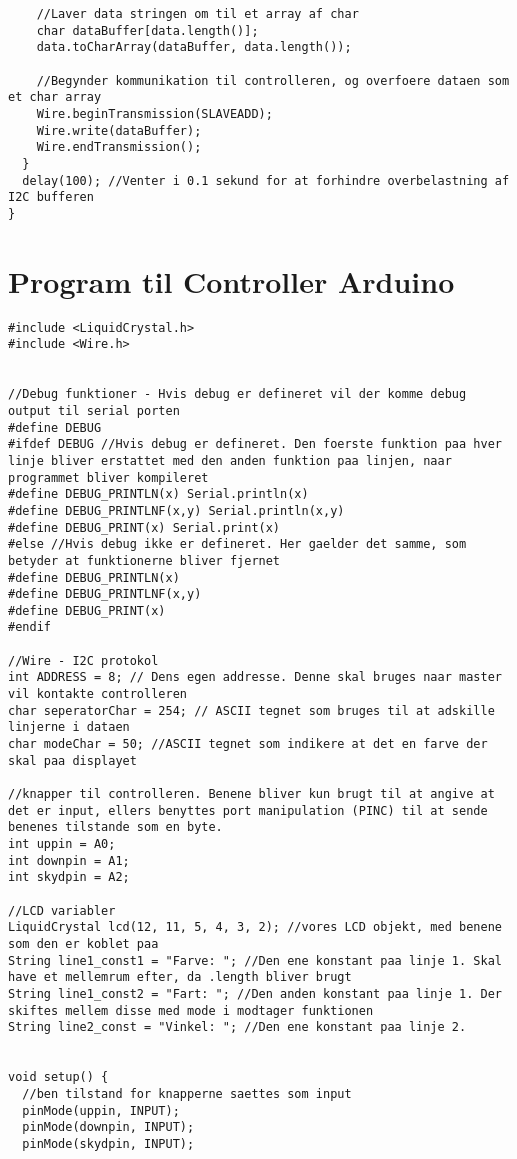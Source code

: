 \begin{lstlisting}
    //Laver data stringen om til et array af char
    char dataBuffer[data.length()];
    data.toCharArray(dataBuffer, data.length());

    //Begynder kommunikation til controlleren, og overfoere dataen som et char array
    Wire.beginTransmission(SLAVEADD);
    Wire.write(dataBuffer);
    Wire.endTransmission();
  }
  delay(100); //Venter i 0.1 sekund for at forhindre overbelastning af I2C bufferen
}
\end{lstlisting}

\section{Program til Controller Arduino}
\label{bilag:programController}
\begin{lstlisting}
#include <LiquidCrystal.h>
#include <Wire.h>


//Debug funktioner - Hvis debug er defineret vil der komme debug output til serial porten
#define DEBUG
#ifdef DEBUG //Hvis debug er defineret. Den foerste funktion paa hver linje bliver erstattet med den anden funktion paa linjen, naar programmet bliver kompileret
#define DEBUG_PRINTLN(x) Serial.println(x)
#define DEBUG_PRINTLNF(x,y) Serial.println(x,y)
#define DEBUG_PRINT(x) Serial.print(x)
#else //Hvis debug ikke er defineret. Her gaelder det samme, som betyder at funktionerne bliver fjernet
#define DEBUG_PRINTLN(x)
#define DEBUG_PRINTLNF(x,y)
#define DEBUG_PRINT(x)
#endif

//Wire - I2C protokol
int ADDRESS = 8; // Dens egen addresse. Denne skal bruges naar master vil kontakte controlleren
char seperatorChar = 254; // ASCII tegnet som bruges til at adskille linjerne i dataen
char modeChar = 50; //ASCII tegnet som indikere at det en farve der skal paa displayet

//knapper til controlleren. Benene bliver kun brugt til at angive at det er input, ellers benyttes port manipulation (PINC) til at sende benenes tilstande som en byte.
int uppin = A0;
int downpin = A1;
int skydpin = A2;

//LCD variabler
LiquidCrystal lcd(12, 11, 5, 4, 3, 2); //vores LCD objekt, med benene som den er koblet paa
String line1_const1 = "Farve: "; //Den ene konstant paa linje 1. Skal have et mellemrum efter, da .length bliver brugt
String line1_const2 = "Fart: "; //Den anden konstant paa linje 1. Der skiftes mellem disse med mode i modtager funktionen
String line2_const = "Vinkel: "; //Den ene konstant paa linje 2.


void setup() {
  //ben tilstand for knapperne saettes som input
  pinMode(uppin, INPUT);
  pinMode(downpin, INPUT);
  pinMode(skydpin, INPUT);


\end{lstlisting}
